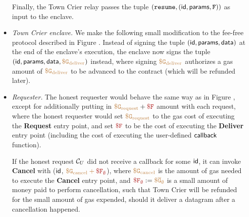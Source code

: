 \begin{itemize}[leftmargin=5mm]
Finally, the Town Crier relay passes
the tuple $({\tt resume}, 
({\sf id}, {\sf params}, 
{\tt F}
))$
as input to the enclave.


\item
{\it Town Crier enclave.}
We make the following small modification to the fee-free protocol
described in Figure .
Instead of signing the tuple $({\sf id}, {\sf params}, {\sf data})$
at the end of the enclave's execution, the enclave now signs 
the tuple $({\sf id}, {\sf params}, {\sf data}, 
\tt {\color{brown} \$ G_{\text{deliver}} })$
instead, where signing 
$\tt {\color{brown} \$ G_{\text{deliver}} }$ authorizes a
gas amount of $\tt {\color{brown} \$ G_{\text{deliver}} }$ to be advanced
to the contract (which will be refunded later).
\item
{\it Requester.}
The honest requester would behave the same way as in Figure ,
except for additionally putting 
in $\sbrown{\$ G_{\text{request}}} + \smaroon{\$ F}$ 
amount with each request, 
where the honest 
requester would set  
$\tt {\color{brown} \$ G_{\text{request}} }$
to the gas cost of executing the  
{\bf Request} entry point,
and set $\smaroon{\$ F}$ to be the cost 
of executing the {\bf Deliver} entry point (including
the cost of executing the user-defined ${\sf callback}$ function).

If the honest request ${\cal C}_U$ did not receive
a callback for some ${\sf id}$,  
it can invoke {\bf Cancel}
with (${\sf id}$, $\sbrown{\$ G_{\text{cancel}} + \smaroon{\$ {F}_\emptyset}}$),
where $\tt {\color{brown} \$ G_{\text{cancel}} }$ is the amount of gas needed 
to execute the {\bf Cancel} entry point, and $\smaroon{\$ {F}_{\emptyset}} := 
\sbrown{\$ \overline{G}_{\emptyset}}$
is a small amount of money paid to perform cancellation, 
such that Town Crier will be refunded for the small amount of gas expended,
should it deliver a datagram after a cancellation happened.

\end{itemize}


